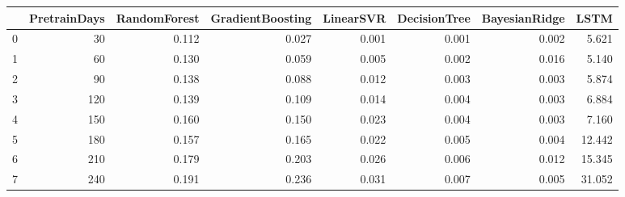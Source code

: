 \begin{tabular}{lrrrrrrr}
\toprule
{} &  PretrainDays &  RandomForest &  GradientBoosting &  LinearSVR &  DecisionTree &  BayesianRidge &   LSTM \\
\midrule
0 &            30 &         0.112 &             0.027 &      0.001 &         0.001 &          0.002 &  5.621 \\
1 &            60 &         0.130 &             0.059 &      0.005 &         0.002 &          0.016 &  5.140 \\
2 &            90 &         0.138 &             0.088 &      0.012 &         0.003 &          0.003 &  5.874 \\
3 &           120 &         0.139 &             0.109 &      0.014 &         0.004 &          0.003 &  6.884 \\
4 &           150 &         0.160 &             0.150 &      0.023 &         0.004 &          0.003 &  7.160 \\
5 &           180 &         0.157 &             0.165 &      0.022 &         0.005 &          0.004 & 12.442 \\
6 &           210 &         0.179 &             0.203 &      0.026 &         0.006 &          0.012 & 15.345 \\
7 &           240 &         0.191 &             0.236 &      0.031 &         0.007 &          0.005 & 31.052 \\
\bottomrule
\end{tabular}
